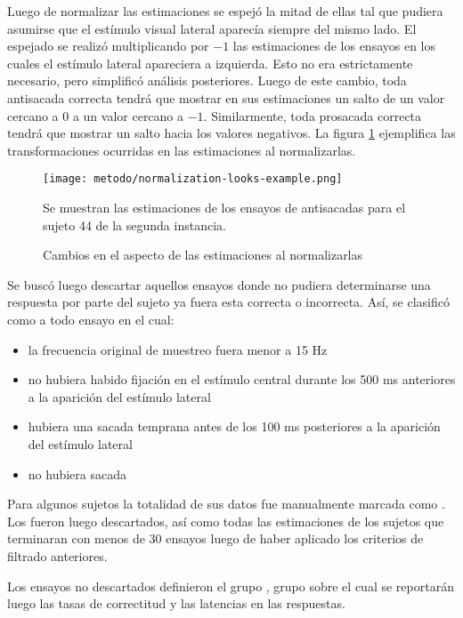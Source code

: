   Luego de normalizar las estimaciones se espejó la mitad de ellas tal que
  pudiera asumirse que el estímulo visual lateral aparecía siempre del mismo
  lado.
  El espejado se realizó multiplicando por $-1$ las estimaciones de los ensayos
  en los cuales el estímulo lateral apareciera a izquierda.
  Esto no era estrictamente necesario, pero simplificó análisis posteriores.
  Luego de este cambio, toda antisacada correcta tendrá que mostrar en sus
  estimaciones un salto de un valor cercano a $0$ a un valor cercano a $-1$.
  Similarmente, toda prosacada correcta tendrá que mostrar un salto hacia los
  valores negativos.
  La figura \ref{fig:normalization-looks-example} ejemplifica las
  transformaciones ocurridas en las estimaciones al normalizarlas.

  \begin{figure}
    \centering

    \texttt{[image: metodo/normalization-looks-example.png]}

    Se muestran las estimaciones de los ensayos de antisacadas para el sujeto
    44 de la segunda instancia.

    \caption{Cambios en el aspecto de las estimaciones al normalizarlas}
    \label{fig:normalization-looks-example}
  \end{figure}

  Se buscó luego descartar aquellos ensayos donde no pudiera determinarse una
  respuesta por parte del sujeto ya fuera esta correcta o incorrecta.
  Así, se clasificó como \outlier a todo ensayo en el cual:
  \begin{itemize}
    \item la frecuencia original de muestreo fuera menor a 15 Hz
    \item no hubiera habido fijación en el estímulo central durante los 500 ms
      anteriores a la aparición del estímulo lateral
    \item hubiera una sacada temprana antes de los 100 ms posteriores a la
      aparición del estímulo lateral
    \item no hubiera sacada
  \end{itemize}
  Para algunos sujetos la totalidad de sus datos fue manualmente marcada como
  \outlier.
  Los \outliers fueron luego descartados, así como todas las estimaciones de
  los sujetos que terminaran con menos de 30 ensayos luego de haber aplicado
  los criterios de filtrado anteriores.

  Los ensayos no descartados definieron el grupo \inlier, grupo sobre el cual
  se reportarán luego las tasas de correctitud y las latencias en las
  respuestas.

